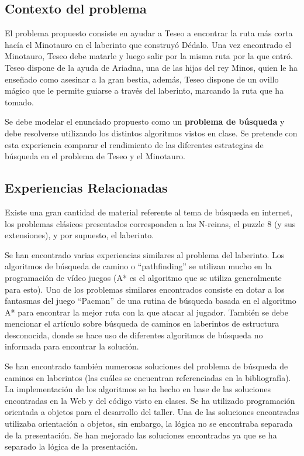 \documentclass[letter, titlepage, 10pt]{article}
\begin{document}
\subsection{Contexto del problema}
El problema propuesto consiste en ayudar a Teseo a encontrar la ruta más corta hacía el Minotauro en el laberinto que construyó Dédalo. Una vez encontrado el Minotauro, Teseo debe matarle y luego salir por la misma ruta por la que entró. Teseo dispone de la ayuda de Ariadna, una de las hijas del rey Minos, quien le ha enseñado como asesinar a la gran bestia, además, Teseo dispone de un ovillo mágico que le permite guiarse a través del laberinto, marcando la ruta que ha tomado. 

Se debe modelar el enunciado propuesto como un \textbf{problema de búsqueda} y debe resolverse utilizando los distintos algoritmos vistos en clase. Se pretende con esta experiencia comparar el rendimiento de las diferentes estrategias de búsqueda en el problema de Teseo y el Minotauro.

\subsection{Experiencias Relacionadas}
Existe una gran cantidad de material referente al tema de búsqueda en internet, los problemas clásicos presentados corresponden a las N-reinas, el puzzle 8 (y sus extensiones), y por supuesto, el laberinto.

Se han encontrado varias experiencias similares al problema del laberinto. Los algoritmos de búsqueda de camino o ``pathfinding'' se utilizan mucho en la programación de vídeo juegos (A* es el algoritmo que se utiliza generalmente para esto). Uno de los problemas similares encontrados consiste en dotar a los fantasmas del juego ``Pacman'' de una rutina de búsqueda basada en el algoritmo A* para encontrar la mejor ruta con la que atacar al jugador. También se debe mencionar el artículo sobre búsqueda de caminos en laberintos de estructura desconocida, donde se hace uso de diferentes algoritmos de búsqueda no informada para encontrar la solución.

Se han encontrado también numerosas soluciones del problema de búsqueda de caminos en laberintos (las cuáles se encuentran referenciadas en la bibliografía). La implementación de los algoritmos se ha hecho en base de las soluciones encontradas en la Web y del código visto en clases. Se ha utilizado programación orientada a objetos para el desarrollo del taller. Una de las soluciones encontradas utilizaba orientación a objetos, sin embargo, la lógica no se encontraba separada de la presentación. Se han mejorado las soluciones encontradas ya que se ha separado la lógica de la presentación. 
\end{document}
